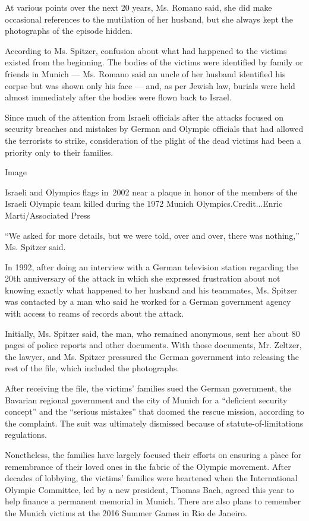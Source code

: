 At various points over the next 20 years, Ms. Romano said, she did make
occasional references to the mutilation of her husband, but she always
kept the photographs of the episode hidden.

According to Ms. Spitzer, confusion about what had happened to the
victims existed from the beginning. The bodies of the victims were
identified by family or friends in Munich --- Ms. Romano said an uncle
of her husband identified his corpse but was shown only his face ---
and, as per Jewish law, burials were held almost immediately after the
bodies were flown back to Israel.

Since much of the attention from Israeli officials after the attacks
focused on security breaches and mistakes by German and Olympic
officials that had allowed the terrorists to strike, consideration of
the plight of the dead victims had been a priority only to their
families.

Image

Israeli and Olympics flags in~2002 near a plaque in honor of the members
of the Israeli Olympic team killed during the 1972 Munich
Olympics.Credit...Enric Marti/Associated Press

``We asked for more details, but we were told, over and over, there was
nothing,'' Ms. Spitzer said.

In 1992, after doing an interview with a German television station
regarding the 20th anniversary of the attack in which she expressed
frustration about not knowing exactly what happened to her husband and
his teammates, Ms. Spitzer was contacted by a man who said he worked for
a German government agency with access to reams of records about the
attack.

Initially, Ms. Spitzer said, the man, who remained anonymous, sent her
about 80 pages of police reports and other documents. With those
documents, Mr. Zeltzer, the lawyer, and Ms. Spitzer pressured the German
government into releasing the rest of the file, which included the
photographs.

After receiving the file, the victims' families sued the German
government, the Bavarian regional government and the city of Munich for
a ``deficient security concept'' and the ``serious mistakes'' that
doomed the rescue mission, according to the complaint. The suit was
ultimately dismissed because of statute-of-limitations regulations.

Nonetheless, the families have largely focused their efforts on ensuring
a place for remembrance of their loved ones in the fabric of the Olympic
movement. After decades of lobbying, the victims' families were
heartened when the International Olympic Committee, led by a new
president, Thomas Bach, agreed this year to help finance a permanent
memorial in Munich. There are also plans to remember the Munich victims
at the 2016 Summer Games in Rio de Janeiro.

